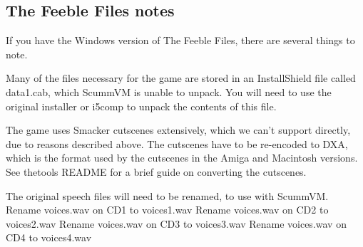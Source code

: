 \subsection{The Feeble Files notes}

If you have the Windows version of The Feeble Files, there are several things
to note. 

Many of the files necessary for the game are stored in an InstallShield file
called data1.cab, which ScummVM is unable to unpack. You will need to use the
original installer or i5comp to unpack the contents of this file.

The game uses Smacker cutscenes extensively, which we can't support directly,
due to reasons described above. The cutscenes have to be re-encoded to DXA,
which is the format used by the cutscenes in the Amiga and Macintosh versions.
See thetools README for a brief guide on converting the cutscenes.

The original speech files will need to be renamed, to use with ScummVM.
Rename voices.wav on CD1 to voices1.wav
Rename voices.wav on CD2 to voices2.wav
Rename voices.wav on CD3 to voices3.wav
Rename voices.wav on CD4 to voices4.wav



